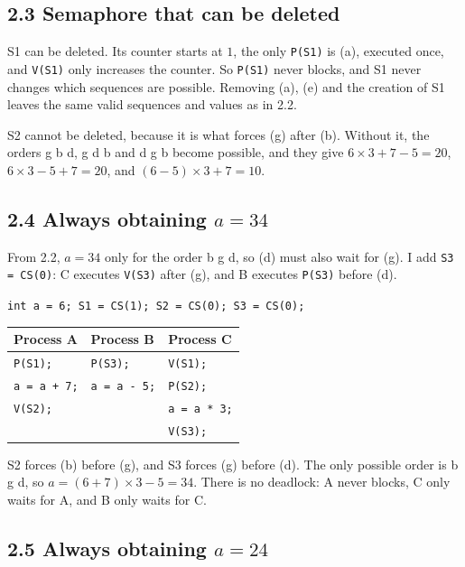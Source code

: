 \documentclass[letterpaper, 11pt]{article}
\newcommand{\1}{\mathds{1}}	%
\theoremstyle{definition}
\begin{document}
\subsection*{2.3 Semaphore that can be deleted}

S1 can be deleted. Its counter starts at $1$, the only \texttt{P(S1)} is (a), executed once, and \texttt{V(S1)} only increases the counter. So \texttt{P(S1)} never blocks, and S1 never changes which sequences are possible. Removing (a), (e) and the creation of S1 leaves the same valid sequences and values as in 2.2.

S2 cannot be deleted, because it is what forces (g) after (b). Without it, the orders g b d, g d b and d g b become possible, and they give $6 \times 3 + 7 - 5 = 20$, $6 \times 3 - 5 + 7 = 20$, and $(6 - 5) \times 3 + 7 = 10$.

\subsection*{2.4 Always obtaining $a = 34$}

From 2.2, $a = 34$ only for the order b g d, so (d) must also wait for (g). I add \texttt{S3 = CS(0)}: C executes \texttt{V(S3)} after (g), and B executes \texttt{P(S3)} before (d).

\begin{center}
\texttt{int a = 6; S1 = CS(1); S2 = CS(0); S3 = CS(0);}

\smallskip
\begin{tabular}{lll}
\toprule
Process A & Process B & Process C \\
\midrule
\texttt{P(S1);}      & \texttt{P(S3);}      & \texttt{V(S1);} \\
\texttt{a = a + 7;}  & \texttt{a = a - 5;}  & \texttt{P(S2);} \\
\texttt{V(S2);}      &                      & \texttt{a = a * 3;} \\
                     &                      & \texttt{V(S3);} \\
\bottomrule
\end{tabular}
\end{center}

S2 forces (b) before (g), and S3 forces (g) before (d). The only possible order is b g d, so $a = (6 + 7) \times 3 - 5 = 34$. There is no deadlock: A never blocks, C only waits for A, and B only waits for C.

\subsection*{2.5 Always obtaining $a = 24$}
\end{document}
